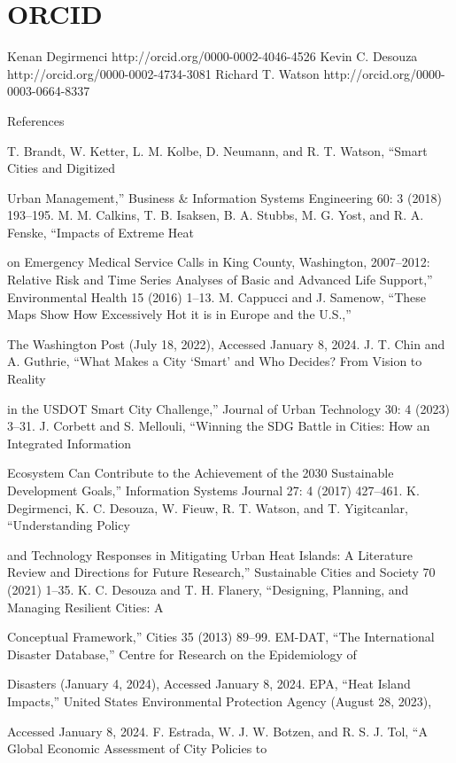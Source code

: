 \documentclass[10pt,a4paper]{article}
\begin{document}
\section{ORCID}

Kenan Degirmenci http://orcid.org/0000-0002-4046-4526 Kevin C. Desouza http://orcid.org/0000-0002-4734-3081 Richard T. Watson http://orcid.org/0000-0003-0664-8337

References

T. Brandt, W. Ketter, L. M. Kolbe, D. Neumann, and R. T. Watson, “Smart Cities and Digitized

Urban Management,” Business \& Information Systems Engineering 60: 3 (2018) 193–195. M. M. Calkins, T. B. Isaksen, B. A. Stubbs, M. G. Yost, and R. A. Fenske, “Impacts of Extreme Heat

on Emergency Medical Service Calls in King County, Washington, 2007–2012: Relative Risk and Time Series Analyses of Basic and Advanced Life Support,” Environmental Health 15 (2016) 1–13. M. Cappucci and J. Samenow, “These Maps Show How Excessively Hot it is in Europe and the U.S.,”

The Washington Post (July 18, 2022), Accessed January 8, 2024. J. T. Chin and A. Guthrie, “What Makes a City ‘Smart’ and Who Decides? From Vision to Reality

in the USDOT Smart City Challenge,” Journal of Urban Technology 30: 4 (2023) 3–31. J. Corbett and S. Mellouli, “Winning the SDG Battle in Cities: How an Integrated Information

Ecosystem Can Contribute to the Achievement of the 2030 Sustainable Development Goals,” Information Systems Journal 27: 4 (2017) 427–461. K. Degirmenci, K. C. Desouza, W. Fieuw, R. T. Watson, and T. Yigitcanlar, “Understanding Policy

and Technology Responses in Mitigating Urban Heat Islands: A Literature Review and Directions for Future Research,” Sustainable Cities and Society 70 (2021) 1–35. K. C. Desouza and T. H. Flanery, “Designing, Planning, and Managing Resilient Cities: A

Conceptual Framework,” Cities 35 (2013) 89–99. EM-DAT, “The International Disaster Database,” Centre for Research on the Epidemiology of

Disasters (January 4, 2024), Accessed January 8, 2024. EPA, “Heat Island Impacts,” United States Environmental Protection Agency (August 28, 2023),

Accessed January 8, 2024. F. Estrada, W. J. W. Botzen, and R. S. J. Tol, “A Global Economic Assessment of City Policies to
\end{document}

